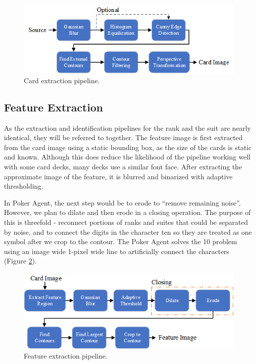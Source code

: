\documentclass[conference]{IEEEtran}
\begin{document}
\begin{figure}[htbp]
\centerline{\includegraphics[width=\columnwidth]{CardExtractionActual.png}}
\caption{Card extraction pipeline.}
\label{fig:pipeline-card-extract}
\end{figure}

\subsection{Feature Extraction}
As the extraction and identification pipelines for the rank and the suit are nearly identical, they
will be referred to together. The feature image is first extracted from the card image using a
static bounding box, as the size of the cards is static and known. Although this does reduce the
likelihood of the pipeline working well with some card decks, many decks use a similar font face.
After extracting the approximate image of the feature, it is blurred and binarized with adaptive
thresholding.

In Poker Agent, the next step would be to erode to “remove remaining noise”. However, we plan to
dilate and then erode in a closing operation. The purpose of this is threefold - reconnect portions
of ranks and suites that could be separated by noise, and to connect the digits in the character ten
so they are treated as one symbol after we crop to the contour. The Poker Agent solves the 10
problem using an image wide 1-pixel wide line to artificially connect the characters (Figure
\ref{fig:pipeline-feature-extract}).

\begin{figure}[htbp]
\centerline{\includegraphics[width=\columnwidth]{feature-extraction.png}}
\caption{Feature extraction pipeline.}
\label{fig:pipeline-feature-extract}
\end{figure}
\end{document}
